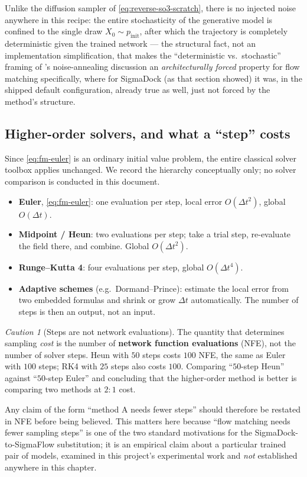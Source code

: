 \documentclass[11pt,a4paper]{report}
\theoremstyle{definition}
\theoremstyle{remark}
\newtheorem{caution}[caution]{Caution}
\begin{document}
Unlike the diffusion sampler of \eqref{eq:reverse-so3-scratch}, there is no
injected noise anywhere in this recipe: the entire stochasticity of the
generative model is confined to the single draw $X_0\sim p_{\mathrm{init}}$,
after which the trajectory is completely deterministic given the trained
network --- the structural fact, not an implementation simplification, that
makes the ``deterministic vs.\ stochastic'' framing of
's noise-annealing discussion an
\emph{architecturally forced} property for flow matching specifically,
where for SigmaDock (as that section showed) it was, in the shipped
default configuration, already true as well, just not forced by the
method's structure.

\subsection{Higher-order solvers, and what a ``step'' costs}
\label{sec:fm-solvers}

Since \eqref{eq:fm-euler} is an ordinary initial value problem, the entire
classical solver toolbox applies unchanged. We record the hierarchy
conceptually only; no solver comparison is conducted in this document.

\begin{itemize}
\item \textbf{Euler}, \eqref{eq:fm-euler}: one evaluation per step, local
      error $O(\Delta t^2)$, global $O(\Delta t)$.
\item \textbf{Midpoint / Heun}: two evaluations per step; take a trial
      step, re-evaluate the field there, and combine. Global $O(\Delta t^2)$.
\item \textbf{Runge--Kutta 4}: four evaluations per step, global
      $O(\Delta t^4)$.
\item \textbf{Adaptive schemes} (e.g.\ Dormand--Prince): estimate the local
      error from two embedded formulas and shrink or grow $\Delta t$
      automatically. The number of steps is then an output, not an input.
\end{itemize}

\begin{caution}[Steps are not network evaluations]
\label{caution:nfe}
The quantity that determines sampling \emph{cost} is the number of
\textbf{network function evaluations} (NFE), not the number of solver
steps. Heun with $50$ steps costs $100$ NFE, the same as Euler with $100$
steps; RK4 with $25$ steps also costs $100$. Comparing ``$50$-step Heun''
against ``$50$-step Euler'' and concluding that the higher-order method is
better is comparing two methods at $2{:}1$ cost.

Any claim of the form ``method A needs fewer steps'' should therefore be
restated in NFE before being believed. This matters here because
``flow matching needs fewer sampling steps'' is one of the two standard
motivations for the SigmaDock-to-SigmaFlow substitution; it is an empirical
claim about a particular trained pair of models, examined in this
project's experimental work and \emph{not} established anywhere in this
chapter.
\end{caution}
\end{document}
